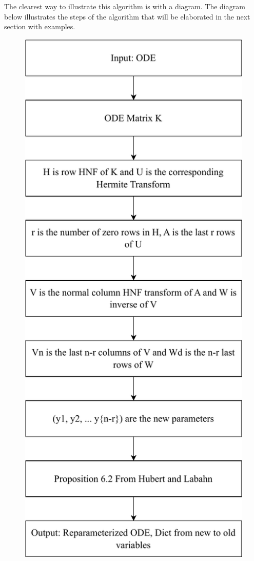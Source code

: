 \documentclass[oneside, a4paper, onecolumn, 11pt]{article}
\begin{document}
The clearest way to illustrate this algorithm is with a diagram. The diagram below illustrates the steps of the algorithm that will be elaborated in the next section with examples.

\newpage


\begin{figure}[H]
    \centering
    \includegraphics{images/Algo.pdf}
\end{figure}
\end{document}
